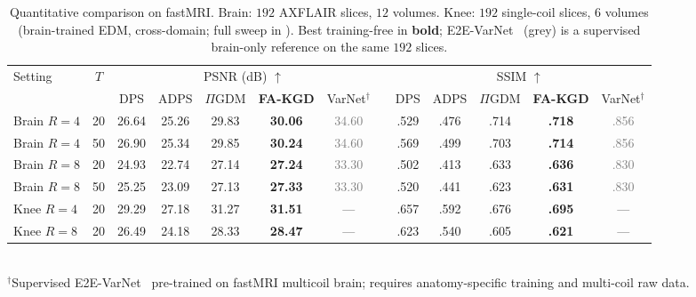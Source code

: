 \documentclass[10pt,twocolumn,letterpaper]{article}
\begin{document}
\begin{table}[t]
\centering
\caption{Quantitative comparison on fastMRI. Brain: $192$ AXFLAIR slices,
$12$ volumes. Knee: $192$ single-coil slices, $6$ volumes (brain-trained
EDM, cross-domain; full sweep in ). Best
training-free in \textbf{bold}; E2E-VarNet~\cite{sriram2020varnet}
(grey) is a supervised brain-only reference on the same $192$ slices.}
\label{tab:results}
\small
\setlength{\tabcolsep}{6pt}
\begin{tabular}{@{}l c ccccc c ccccc@{}}
\toprule
\multirow{2}{*}{Setting} & \multirow{2}{*}{$T$}
  & \multicolumn{5}{c}{PSNR (dB) $\uparrow$} & \phantom{x}
  & \multicolumn{5}{c}{SSIM $\uparrow$} \\
\cmidrule{3-7} \cmidrule{9-13}
 & & DPS & ADPS & $\Pi$GDM & \textbf{FA-KGD} & VarNet$^\dagger$ &
 & DPS & ADPS & $\Pi$GDM & \textbf{FA-KGD} & VarNet$^\dagger$ \\
\midrule
Brain $R{=}4$ & 20 & 26.64 & 25.26 & 29.83 & \textbf{30.06} & \textcolor{gray}{34.60} & & .529 & .476 & .714 & \textbf{.718} & \textcolor{gray}{.856} \\
Brain $R{=}4$ & 50 & 26.90 & 25.34 & 29.85 & \textbf{30.24} & \textcolor{gray}{34.60} & & .569 & .499 & .703 & \textbf{.714} & \textcolor{gray}{.856} \\
Brain $R{=}8$ & 20 & 24.93 & 22.74 & 27.14 & \textbf{27.24} & \textcolor{gray}{33.30} & & .502 & .413 & .633 & \textbf{.636} & \textcolor{gray}{.830} \\
Brain $R{=}8$ & 50 & 25.25 & 23.09 & 27.13 & \textbf{27.33} & \textcolor{gray}{33.30} & & .520 & .441 & .623 & \textbf{.631} & \textcolor{gray}{.830} \\
Knee $R{=}4$  & 20 & 29.29 & 27.18 & 31.27 & \textbf{31.51} & ---                      & & .657 & .592 & .676 & \textbf{.695} & --- \\
Knee $R{=}8$  & 20 & 26.49 & 24.18 & 28.33 & \textbf{28.47} & ---                      & & .623 & .540 & .605 & \textbf{.621} & --- \\
\bottomrule
\end{tabular}
\vspace{2pt}
\\{\scriptsize $^\dagger$Supervised E2E-VarNet~\cite{sriram2020varnet} pre-trained on fastMRI multicoil brain; requires anatomy-specific training and multi-coil raw data.}
\end{table}
\end{document}
